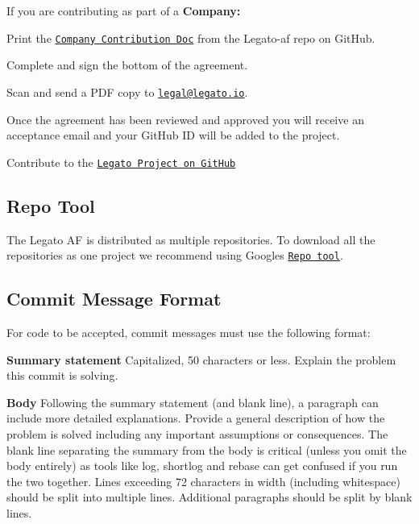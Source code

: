 If you are contributing as part of a {\bfseries Company\+:} 


\begin{DoxyEnumerate}
\item Print the \href{https://github.com/legatoproject/legato-af/blob/master/CONTRIB_COMPANY.md}{\tt Company Contribution Doc} from the Legato-\/af repo on Git\+Hub.
\item Complete and sign the bottom of the agreement.
\item Scan and send a P\+DF copy to \href{mailto:legal@legato.io}{\tt legal@legato.\+io}.
\item Once the agreement has been reviewed and approved you will receive an acceptance email and your Git\+Hub ID will be added to the project.
\item Contribute to the \href{https://github.com/legatoproject/}{\tt Legato Project on Git\+Hub}
\end{DoxyEnumerate}\hypertarget{aboutLegatoContributing_aboutLegatoContributing_repo}{}\subsection{Repo Tool}\label{aboutLegatoContributing_aboutLegatoContributing_repo}
The Legato AF is distributed as multiple repositories. To download all the repositories as one project we recommend using Google\textquotesingle{}s \href{https://code.google.com/p/git-repo/}{\tt Repo tool}.\hypertarget{aboutLegatoContributing_aboutLegatoContributing_commitMsg}{}\subsection{Commit Message Format}\label{aboutLegatoContributing_aboutLegatoContributing_commitMsg}
For code to be accepted, commit messages must use the following format\+:

{\bfseries Summary statement} Capitalized, 50 characters or less. Explain the problem this commit is solving.

{\bfseries Body} Following the summary statement (and blank line), a paragraph can include more detailed explanations. Provide a general description of how the problem is solved including any important assumptions or consequences. The blank line separating the summary from the body is critical (unless you omit the body entirely) as tools like {\ttfamily log}, {\ttfamily shortlog} and {\ttfamily rebase} can get confused if you run the two together. Lines exceeding 72 characters in width (including whitespace) should be split into multiple lines. Additional paragraphs should be split by blank lines.

